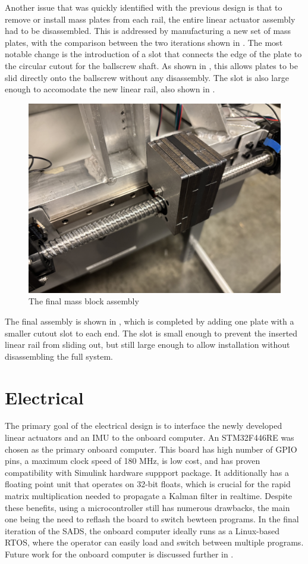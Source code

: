 Another issue that was quickly identified with the previous design is that to remove or install mass plates from each rail, the entire linear actuator assembly had to be disassembled. This is addressed by manufacturing a new set of mass plates, with the comparison between the two iterations shown in . The most notable change is the introduction of a slot that connects the edge of the plate to the circular cutout for the ballscrew shaft. As shown in , this allows plates to be slid directly onto the ballscrew without any disassembly. The slot is also large enough to accomodate the new linear rail, also shown in .

\begin{figure}[h]
    \centering
    \includegraphics[width=0.85\linewidth]{figures/completed_block.jpg}
    \caption{The final mass block assembly}
    \label{fig:plate_comparison}
\end{figure}

The final assembly is shown in , which is completed by adding one plate with a smaller cutout slot to each end. The slot is small enough to prevent the inserted linear rail from sliding out, but still large enough to allow installation without disassembling the full system. 

\section{Electrical}

The primary goal of the electrical design is to interface the newly developed linear actuators and an IMU to the onboard computer. An STM32F446RE was chosen as the primary onboard computer. This board has high number of GPIO pins, a maximum clock speed of 180 MHz, is low cost, and has proven compatibility with Simulink hardware suppport package. It additionally has a floating point unit that operates on 32-bit floats, which is crucial for the rapid matrix multiplication needed to propagate a Kalman filter in realtime. Despite these benefits, using a microcontroller still has numerous drawbacks, the main one being the need to reflash the board to switch bewteen programs. In the final iteration of the SADS, the onboard computer ideally runs as a Linux-based RTOS, where the operator can easily load and switch between multiple programs. Future work for the onboard computer is discussed further in .

